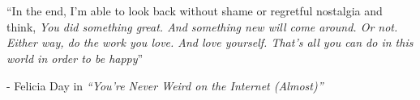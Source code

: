 \chapter*{}


``In the end, I'm able to look back without shame or regretful nostalgia and think, \textit{You did something great. And something new will come around. Or not. Either way, do the work you love. And love yourself. That's all you can do in this world in order to be happy}'' 

- Felicia Day in \textit{``You're Never Weird on the Internet (Almost)''}